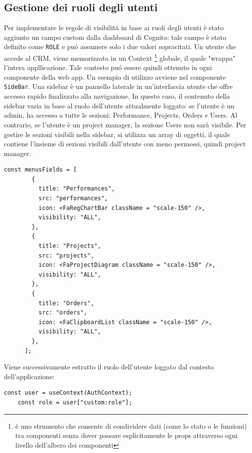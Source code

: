 \documentclass[target=bach,aauheader=,style=]{thud}
\begin{document}
\subsection{Gestione dei ruoli degli utenti}
Per implementare le regole di visibilità in base ai ruoli degli utenti è stato aggiunto un campo custom dalla dashboard di Cognito: tale campo è stato definito come \texttt{ROLE} e puó assumere solo i due valori sopracitati. Un utente che accede al CRM, viene memorizzato in un Context \footnote{è uno strumento che consente di condividere dati (come lo stato o le funzioni) tra componenti senza dover passare esplicitamente le props attraverso ogni livello dell'albero dei componenti} globale, il quale "wrappa" l'intera appllicazione. Tale contesto puó essere quindi ottenuto in ogni componente della web app. Un esempio di utilizzo avviene nel componente \texttt{SideBar}. Una sidebar è un pannello laterale in un'interfaccia utente che offre accesso rapido finalizzato alla navigazione. In questo caso, il contenuto della sidebar varia in base al ruolo dell'utente attualmente loggato: se l'utente è un admin, ha accesso a tutte le sezioni: Performance, Projects, Orders e Users. Al contrario, se l'utente è un project manager, la sezione Users non sarà visibile. Per gestire le sezioni visibili nella sidebar, si utilizza un array di oggetti, il quale contiene l'insieme di sezioni visibili dall'utente con meno permessi, quindi project manager. 

\begin{lstlisting}[caption=Campi default visibili nella sidebar]
    const menusFields = [
        {
          title: "Performances",
          src: "performances",
          icon: <FaRegChartBar className = "scale-150" />,
          visibility: "ALL",
        },
        {
          title: "Projects",
          src: "projects",
          icon: <FaProjectDiagram className = "scale-150" />,
          visibility: "ALL",
        },
        {
          title: "Orders",
          src: "orders",
          icon: <FaClipboardList className = "scale-150" />,
          visibility: "ALL",
        },
      ];
\end{lstlisting}

\noindent Viene successivamente estratto il ruolo dell'utente loggato dal contesto dell'applicazione:

\begin{lstlisting}[caption=Parte del file \texttt{AuthenticatedLayout.tsx} del CRM]
    const user = useContext(AuthContext);
    const role = user["custom:role"];
\end{lstlisting}
\end{document}
